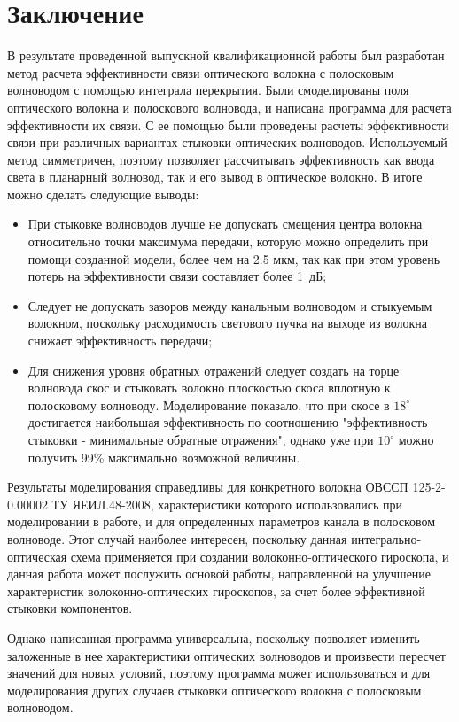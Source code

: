 \chapter*{Заключение}

В результате проведенной выпускной квалификационной работы был разработан метод расчета эффективности связи оптического волокна с полосковым волноводом с помощью интеграла перекрытия. Были смоделированы поля оптического волокна и полоскового волновода, и написана программа для расчета эффективности их связи. С ее помощью были проведены расчеты эффективности связи при различных вариантах стыковки оптических волноводов.
Используемый метод симметричен, поэтому позволяет рассчитывать эффективность как ввода света в планарный волновод, так и его вывод в оптическое волокно. В итоге можно сделать следующие выводы:

\begin{itemize}
	\item При стыковке волноводов лучше не допускать смещения центра волокна относительно точки максимума передачи, которую можно определить при помощи созданной модели, более чем на 2.5 мкм, так как при этом уровень потерь на эффективности связи составляет более 1~дБ;
	\item Следует не допускать зазоров между канальным волноводом и стыкуемым волокном, поскольку расходимость светового пучка на выходе из волокна снижает эффективность передачи;
	\item Для снижения уровня обратных отражений следует создать на торце волновода скос и стыковать волокно плоскостью скоса вплотную к полосковому волноводу. Моделирование показало, что при скосе в $18^\circ$ достигается наибольшая эффективность по соотношению "эффективность стыковки - минимальные обратные отражения", однако уже при $10^\circ$ можно получить 99\% максимально возможной величины.
\end{itemize}

Результаты моделирования справедливы для конкретного волокна ОВССП 125-2-0.00002 ТУ ЯЕИЛ.48-2008, характеристики которого использовались при моделировании в работе, и для определенных параметров канала в полосковом волноводе. Этот случай наиболее интересен, поскольку данная интегрально-оптическая схема применяется при создании волоконно-оптического гироскопа, и данная работа может послужить основой работы, направленной на улучшение характеристик волоконно-оптических гироскопов, за счет более эффективной стыковки компонентов.

Однако написанная программа универсальна, поскольку позволяет изменить заложенные в нее характеристики оптических волноводов и произвести пересчет значений для новых условий, поэтому программа может использоваться и для моделирования других случаев стыковки оптического волокна с полосковым волноводом.